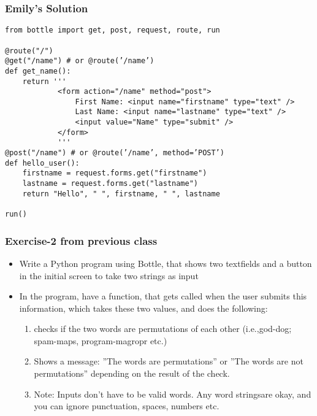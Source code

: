 \documentclass{beamer}
\begin{document}
\begin{frame}[fragile]
\frametitle{Emily's Solution}
\scriptsize
\begin{verbatim}
from bottle import get, post, request, route, run

@route("/")
@get("/name") # or @route(’/name’)
def get_name():
    return '''
            <form action="/name" method="post">
                First Name: <input name="firstname" type="text" />
                Last Name: <input name="lastname" type="text" />
                <input value="Name" type="submit" />
            </form>
            '''
@post("/name") # or @route(’/name’, method=’POST’)
def hello_user():
    firstname = request.forms.get("firstname")
    lastname = request.forms.get("lastname")
    return "Hello", " ", firstname, " ", lastname

run()
\end{verbatim}
\end{frame}

\begin{frame}
\frametitle{Exercise-2 from previous class}
\begin{itemize}
\item Write a Python program using Bottle, that shows two textfields and a button in the initial screen to take two strings as input
\item In the program, have a function, that gets called when the user submits this information, which takes these two values, and does the following:
\begin{enumerate}
\item checks if the two words are permutations of each other (i.e.,god-dog; spam-maps, program-magropr etc.)
\item Shows a message:  ”The words are permutations” or ”The words are not permutations” depending on the result of the check.
\item Note:  Inputs don’t have to be valid words.  Any word stringsare okay, and you can ignore punctuation, spaces, numbers etc.
\end{enumerate}\end{itemize}
\end{frame}
\end{document}
